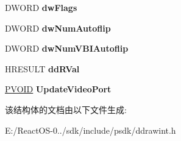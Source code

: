 \begin{DoxyCompactItemize}
\item 
\mbox{\label{struct___d_d___u_p_d_a_t_e_v_p_o_r_t_d_a_t_a_a617a0f8ed96a40c9c4c46f470d023efb}} 
D\+W\+O\+RD {\bfseries dw\+Flags}
\item 
\mbox{\label{struct___d_d___u_p_d_a_t_e_v_p_o_r_t_d_a_t_a_a39f4794d9888e99f14e5e22de451f2be}} 
D\+W\+O\+RD {\bfseries dw\+Num\+Autoflip}
\item 
\mbox{\label{struct___d_d___u_p_d_a_t_e_v_p_o_r_t_d_a_t_a_ac1c9a0b61232a6660b31c308ca3d9447}} 
D\+W\+O\+RD {\bfseries dw\+Num\+V\+B\+I\+Autoflip}
\item 
\mbox{\label{struct___d_d___u_p_d_a_t_e_v_p_o_r_t_d_a_t_a_a3e8e611a30e3f08d62d6899ceec24f88}} 
H\+R\+E\+S\+U\+LT {\bfseries dd\+R\+Val}
\item 
\mbox{\label{struct___d_d___u_p_d_a_t_e_v_p_o_r_t_d_a_t_a_acb84604ba6c16cd40b302420b9082617}} 
\hyperlink{interfacevoid}{P\+V\+O\+ID} {\bfseries Update\+Video\+Port}
\end{DoxyCompactItemize}


该结构体的文档由以下文件生成\+:\begin{DoxyCompactItemize}
\item 
E\+:/\+React\+O\+S-\/0../sdk/include/psdk/ddrawint.\+h\end{DoxyCompactItemize}
